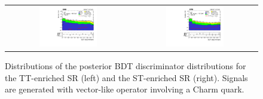 \begin{figure}[tbh!]
 \begin{center}
 \begin{tabular}{cc}
  \includegraphics[width=0.48\textwidth]{figures/Part3/Results/BDT_TT_VecC}&
  \includegraphics[width=0.48\textwidth]{figures/Part3/Results/BDT_ST_VecC}\\
 \end{tabular}
 \caption{Distributions of the posterior BDT discriminator distributions for the TT-enriched SR (left) and the ST-enriched SR (right). Signals are generated with vector-like operator involving a Charm quark.}
 \label{fig:bdt_postfit_VecC}
 \end{center}
\end{figure} 

